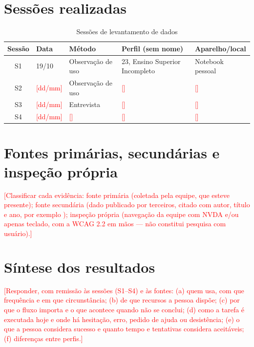 \documentclass[
  12pt,
  oneside,
  a4paper,
  chapter=TITLE,
  section=TITLE,
  english,
  brazil
]{abntex2}
\newcommand{\preencher}[1]{\textcolor{red}{[#1]}}
\begin{document}
\section{Sessões realizadas}

\begin{table}[htbp]
  \caption{Sessões de levantamento de dados}\label{tab:sessoes}
  \centering\small
  \begin{tabular}{cllll}\toprule
    \textbf{Sessão} & \textbf{Data} & \textbf{Método} & \textbf{Perfil (sem nome)} & \textbf{Aparelho/local} \\\midrule
    S1 & 19/10 & Observação de uso & 23, Ensino Superior Incompleto & Notebook pessoal \\
    S2 & \preencher{dd/mm} & Observação de uso & \preencher{} & \preencher{} \\
    S3 & \preencher{dd/mm} & Entrevista        & \preencher{} & \preencher{} \\
    S4 & \preencher{dd/mm} & \preencher{}      & \preencher{} & \preencher{} \\\bottomrule
  \end{tabular}
\end{table}

\section{Fontes primárias, secundárias e inspeção própria}

\preencher{Classificar cada evidência: fonte primária (coletada pela equipe, que
esteve presente); fonte secundária (dado publicado por terceiros, citado com
autor, título e ano, por exemplo \citeonline{ticdomicilios}); inspeção própria
(navegação da equipe com NVDA e/ou apenas teclado, com a WCAG 2.2 em mãos ---
não constitui pesquisa com usuário).}

\section{Síntese dos resultados}

\preencher{Responder, com remissão às sessões (S1--S4) e às fontes: (a) quem usa,
com que frequência e em que circunstância; (b) de que recursos a pessoa dispõe;
(c) por que o fluxo importa e o que acontece quando não se conclui; (d) como a
tarefa é executada hoje e onde há hesitação, erro, pedido de ajuda ou desistência;
(e) o que a pessoa considera sucesso e quanto tempo e tentativas considera
aceitáveis; (f) diferenças entre perfis.}
\end{document}
